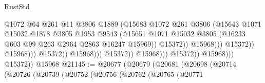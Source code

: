 \begin{lexlean}{RustStd}
\begin{coremodule}
                                                      @1072
                                                      @64
                                                      @261
                                                      @11
                                                      @3806
                                                      @1889
                                                      (@15683
                                                        @1072
                                                        @261
                                                        @3806
                                                        (@15643
                                                          @1071
                                                          @15032
                                                          @1878
                                                          @3805
                                                          @1953
                                                          @9543
                                                          (@15651
                                                            @1071
                                                            @15032
                                                            @3805
                                                            (@16233
                                                              @603
                                                              @99
                                                              @263
                                                              @2964
                                                              @2863
                                                              @16247
                                                              @15969))
                                                          @15372))
                                                      @15968)))
                                                @15372))
                                            @15968)))
                                      @15372))
                                  @15968)))
                            @15372))
                        @15968)))
                  @15372))
              @15968)))
        @15372))
    @15968
@21145 := @20677
    (@20679
      (@20681
        (@20698
          (@20714
            (@20726
              (@20739
                (@20752
                  (@20756
                    (@20762
                      (@20765
                        (@20771

\end{coremodule}
\end{lexlean}
